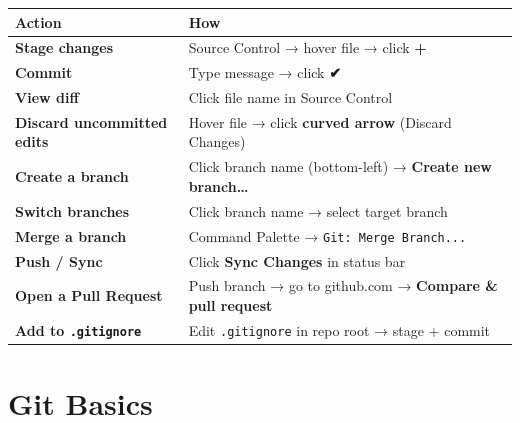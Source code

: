 \documentclass[
  letterpaper,
  DIV=11,
  numbers=noendperiod,
  oneside]{scrreprt}
\begin{document}
\begin{longtable}[]{@{}
  >{\raggedright\arraybackslash}p{}
  >{\raggedright\arraybackslash}p{}@{}}
\toprule\noalign{}
\begin{minipage}[b]{\linewidth}\raggedright
Action
\end{minipage} & \begin{minipage}[b]{\linewidth}\raggedright
How
\end{minipage} \\
\midrule\noalign{}
\endhead
\bottomrule\noalign{}
\endlastfoot
\textbf{Stage changes} & Source Control → hover file → click
\textbf{+} \\
\textbf{Commit} & Type message → click \textbf{✔} \\
\textbf{View diff} & Click file name in Source Control \\
\textbf{Discard uncommitted edits} & Hover file → click \textbf{curved
arrow} (Discard Changes) \\
\textbf{Create a branch} & Click branch name (bottom-left) →
\textbf{Create new branch\ldots{}} \\
\textbf{Switch branches} & Click branch name → select target branch \\
\textbf{Merge a branch} & Command Palette →
\texttt{Git:\ Merge\ Branch...} \\
\textbf{Push / Sync} & Click \textbf{Sync Changes} in status bar \\
\textbf{Open a Pull Request} & Push branch → go to github.com →
\textbf{Compare \& pull request} \\
\textbf{Add to \texttt{.gitignore}} & Edit \texttt{.gitignore} in repo
root → stage + commit \\
\end{longtable}

\chapter*{Git Basics}\label{git-basics}

\end{document}
